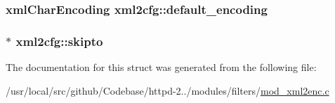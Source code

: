 \subsubsection[{\texorpdfstring{default\+\_\+encoding}{default_encoding}}]{\setlength{\rightskip}{0pt plus 5cm}xml\+Char\+Encoding xml2cfg\+::default\+\_\+encoding}\hypertarget{structxml2cfg_ada5ab3fab0d8d282a6d9cd061e1404a8}{}\label{structxml2cfg_ada5ab3fab0d8d282a6d9cd061e1404a8}
\subsubsection[{\texorpdfstring{skipto}{skipto}}]{$\ast$ xml2cfg\+::skipto}\hypertarget{structxml2cfg_a214dc39dfbb5e7bb0e3b01ccb0589b02}{}\label{structxml2cfg_a214dc39dfbb5e7bb0e3b01ccb0589b02}


The documentation for this struct was generated from the following file\+:\begin{DoxyCompactItemize}
\item 
/usr/local/src/github/\+Codebase/httpd-\/2../modules/filters/\hyperlink{mod__xml2enc_8c}{mod\+\_\+xml2enc.\+c}\end{DoxyCompactItemize}
